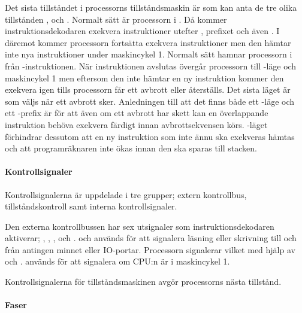 \documentclass[main.tex]{subfiles}
\begin{document}
Det sista tillståndet i processorns tillståndsmaskin är  som kan
anta de tre olika tillstånden ,  och .
Normalt sätt är processorn i . Då kommer instruktionsdekodaren
exekvera instruktioner utefter , prefixet och även . I
 däremot kommer processorn fortsätta exekvera instruktioner men den
hämtar inte nya instruktioner under maskincykel 1. Normalt sätt hamnar
processorn i  från -instruktionen. När 
instruktionen  avslutas övergår processorn till -läge och
maskincykel 1 men eftersom den inte hämtar en ny instruktion kommer den
exekvera  igen tills processorn får ett avbrott eller återställs.
Det sista läget är  som väljs när ett avbrott sker. Anledningen
till att det finns både ett -läge och ett -prefix är
för att även om ett avbrott har skett kan en överlappande instruktion behöva
exekvera färdigt innan avbrottsekvensen körs. -läget förhindrar
dessutom att en ny instruktion som inte ännu ska exekveras hämtas och att
programräknaren inte ökas innan den ska sparas till stacken.

\paragraph{Kontrollsignaler}
Kontrollsignalerna är uppdelade i tre grupper; extern kontrollbus,
tillståndskontroll samt interna kontrollsignaler.

Den externa kontrollbussen har sex utsignaler som instruktionsdekodaren
aktiverar; , , ,  och .
 och  används för att signalera läsning eller skrivning till
och från antingen minnet eller IO-portar. Processorn signalerar vilket med
hjälp av  och .  används för att signalera om
CPU:n är i maskincykel 1.

Kontrollsignalerna för tillståndsmaskinen avgör processorns nästa tillstånd.


\paragraph{Faser}
\end{document}
